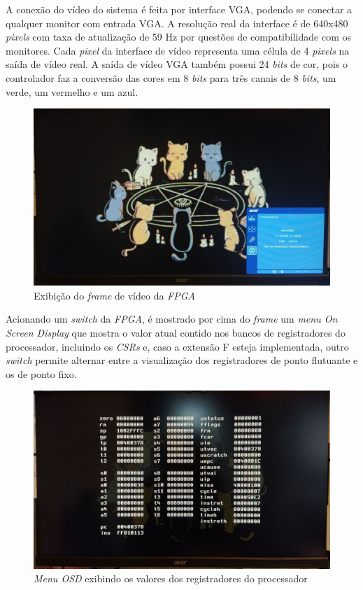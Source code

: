     { A conexão do vídeo do sistema é feita por interface VGA, podendo se
        conectar a qualquer monitor com entrada VGA. A resolução real da
        interface é de 640x480 \textit{pixels} com taxa de atualização de 59 Hz
        por questões de compatibilidade com os monitores. Cada \textit{pixel}
        da interface de vídeo representa uma célula de 4 \textit{pixels} na
        saída de vídeo real. A saída de vídeo VGA também possui 24 \textit{bits}
        de cor, pois o controlador faz a conversão das cores em 8 \textit{bits}
        para três canais de 8 \textit{bits}, um verde, um vermelho e um azul.
    }
    \begin{figure}[H]
    \centering
        \includegraphics[width=.9\linewidth]{../images/osd/display.jpg}
        \caption{Exibição do \textit{frame} de vídeo da \textit{FPGA}}
        \label{fig:display_cats}
    \end{figure}

    { Acionando um \textit{switch} da \textit{FPGA}, é mostrado por cima do
        \textit{frame} um \textit{menu On Screen Display} que mostra o valor
        atual contido nos bancos de registradores do processador, incluindo os
        \textit{CSRs} e, caso a extensão F esteja implementada, outro
        \textit{switch} permite alternar entre a visualização dos registradores
        de ponto flutuante e os de ponto fixo.
    }
    \begin{figure}[H]
    \centering
        \includegraphics[width=.9\linewidth]{../images/osd/display_osd.jpg}
        \caption{\textit{Menu OSD} exibindo os valores dos registradores do processador}
        \label{fig:display_cats_osd}
    \end{figure}

